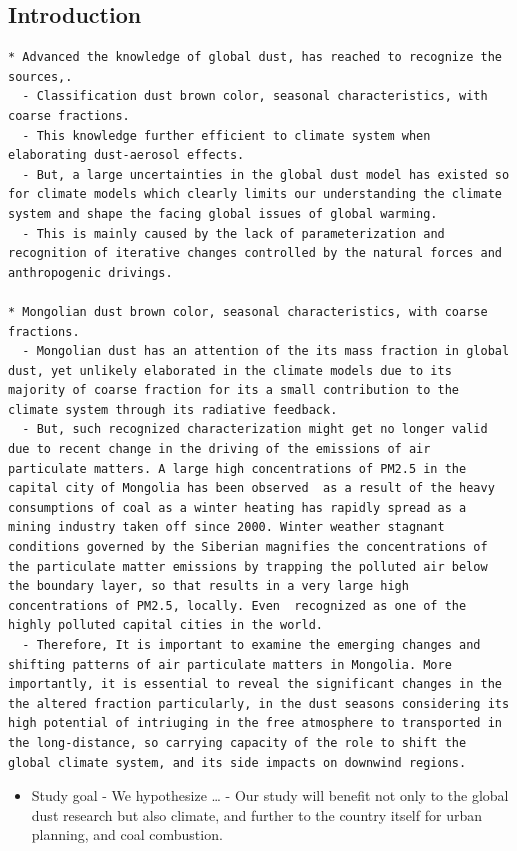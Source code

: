 \documentclass[
  11pt,
]{article}
\providecommand{\tightlist}{%
  \setlength{\itemsep}{0pt}\setlength{\parskip}{0pt}}
\begin{document}
\subsection{Introduction}\label{introduction}

\begin{verbatim}
* Advanced the knowledge of global dust, has reached to recognize the sources,.
  - Classification dust brown color, seasonal characteristics, with coarse fractions.
  - This knowledge further efficient to climate system when elaborating dust-aerosol effects.
  - But, a large uncertainties in the global dust model has existed so for climate models which clearly limits our understanding the climate system and shape the facing global issues of global warming.
  - This is mainly caused by the lack of parameterization and recognition of iterative changes controlled by the natural forces and anthropogenic drivings.

* Mongolian dust brown color, seasonal characteristics, with coarse fractions.
  - Mongolian dust has an attention of the its mass fraction in global dust, yet unlikely elaborated in the climate models due to its majority of coarse fraction for its a small contribution to the climate system through its radiative feedback.
  - But, such recognized characterization might get no longer valid due to recent change in the driving of the emissions of air particulate matters. A large high concentrations of PM2.5 in the capital city of Mongolia has been observed  as a result of the heavy consumptions of coal as a winter heating has rapidly spread as a mining industry taken off since 2000. Winter weather stagnant conditions governed by the Siberian magnifies the concentrations of the particulate matter emissions by trapping the polluted air below the boundary layer, so that results in a very large high concentrations of PM2.5, locally. Even  recognized as one of the highly polluted capital cities in the world.
  - Therefore, It is important to examine the emerging changes and shifting patterns of air particulate matters in Mongolia. More importantly, it is essential to reveal the significant changes in the the altered fraction particularly, in the dust seasons considering its high potential of intriuging in the free atmosphere to transported in the long-distance, so carrying capacity of the role to shift the global climate system, and its side impacts on downwind regions.
\end{verbatim}

\begin{itemize}
\tightlist
\item
  Study goal - We hypothesize \ldots{} - Our study will benefit not only
  to the global dust research but also climate, and further to the
  country itself for urban planning, and coal combustion.
\end{itemize}
\end{document}
